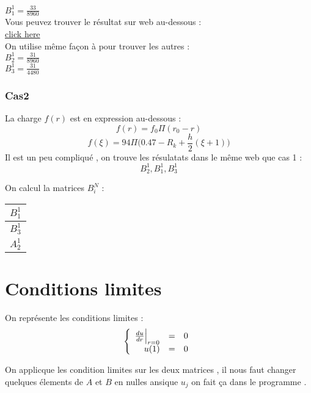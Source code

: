 \documentclass[a4paper,10pt]{report} %
\begin{document}
 
 $B_1^1=\frac{33}{8960}$\\
 
 
 Vous peuvez trouver le résultat sur web au-dessous :\\
 
 \href{https://www.wolframalpha.com/input/?i=integral+a%2F2*(b%2Ba*x%2F2%2Ba%2F2)(1-(b%2Ba*x%2F2%2Ba%2F2))%5E4*(1%2F2*x%5E2-1%2F2x)+dx++from+-1+to+1}{click here}\\
 
 On utilise même façon à pour trouver les autres :\\
 
 
 $B_2^1=\frac{31}{8960}$\\
 
 
 $B_3^1=\frac{31}{4480}$\\


 \subsubsection{Cas2}
 La charge $f(r)$ est en expression au-dessous :
 \begin{equation}
 f(r)=f_0\Pi(r_0-r)
 \end{equation}
  \begin{equation}
 f(\xi)=94\Pi\Big(0.47-R_k+\frac{h}{2}(\xi+1)\Big)
 \end{equation}
 Il est un peu compliqué , on trouve les résulatats dans le même web que cas 1 :
 $$B_2^1 , B_1^1  , B_3^1$$
 
On calcul la matrices $B_{i}^N$ :
\begin{center}
\begin{tabular}{|c|}
     \hline
     $B_1^1$  \\
     \hline
      $B_3^1$ \\
     \hline
     $A_2^1$ \\
     \hline 

\end{tabular}
\end{center}
\section{Conditions limites}

On représente les conditions limites :
$$
\left\{
\begin{array}{r c l}
\frac{du}{dr}\Big|_{r=0}&=&0\\u(1)&=&0
\end{array}
\right.
$$

On applicque les condition limites sur les deux matrices , il nous faut changer quelques élements de $A$ et $B$ en nulles ansique $u_j$  on fait ça dans le programme .
\end{document}
